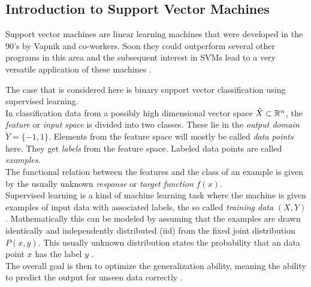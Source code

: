 
\subsection{Introduction to Support Vector Machines}
Support vector machines are linear learning machines that were developed in the 90's by Vapnik and co-workers. Soon they could outperform several other programs in this area \cite{Cristianini2000} and the subsequent interest in SVMs lead to a very versatile application of these machines \cite{Kunapuli2008}.

The case that is considered here is binary support vector classification using supervised learning. \\
In classification data from a possibly high dimensional vector space \(\tilde{X} \subset \mathbb{R}^n\), the \emph{feature} or \emph{input space} is divided into two classes. These lie in the \emph{output domain} \(\tilde{Y} = \{-1,1\}\). Elements from the feature space will mostly be called \emph{data points} here. They get \emph{labels} from the feature space. Labeled data points are called \emph{examples}. \\
The functional relation between the features and the class of an example is given by the usually unknown \emph{response} or \emph{target function} \(f(x)\). \\
Supervised learning is a kind of machine learning task where the machine is given examples of input data with associated labels, the so called \emph{training data} \((X,Y)\). Mathematically this can be modeled by assuming that the examples are  drawn identically and independently distributed (iid) from the fixed joint distribution \(P(x,y)\). This usually unknown distribution states the probability that an data point \(x\) has the label \(y\) \cite{Vapnik1999}. \\
The overall goal is then to optimize the generalization ability, meaning the ability to predict the output for unseen data correctly \cite{Cristianini2000}.

